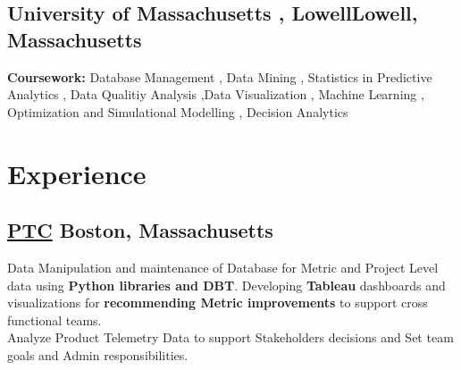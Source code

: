 \documentclass[]{Keval-resume}
\begin{document}
\subsection{University of Massachusetts , Lowell\hfill \normalfont L\lowercase{owell}, M\lowercase{assachusetts}}
\begin{flushleft}
\textbullet{} \textbf{Coursework:} Database Management , Data Mining , Statistics in Predictive Analytics , Data Qualitiy Analysis ,\linebreak  Data Visualization , Machine Learning , Optimization and Simulational Modelling  ,  Decision Analytics \\

\sectionsep




\sectionsep

\section{Experience} 
\hrulefill
\postsectionsep 

\subsection{ \href{https://www.ptc.com/}{PTC} \hfill \normalfont B\lowercase{oston,} M\lowercase{assachusetts} }
\textbullet{} Data Manipulation and maintenance of Database for Metric and Project Level data using \textbf{Python libraries and DBT}.\linebreak
\textbullet{} Developing \textbf{Tableau} dashboards and visualizations for \textbf{recommending Metric improvements} to support cross functional teams. \\
\textbullet{} Analyze Product Telemetry Data to support Stakeholders decisions and Set team goals and Admin responsibilities. 


\end{flushleft}
\end{document}
